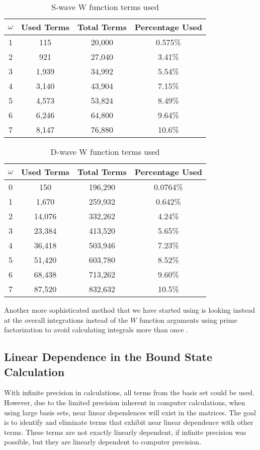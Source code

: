 \documentclass[Dissertation.tex]{subfiles}
\begin{document}
\begin{table}
\centering
\begin{tabular}{c c c c}
\toprule
$\omega$ & Used Terms & Total Terms & Percentage Used \\
\midrule
1 & 	115   &  20,000 & 	0.575\% \\
2 & 	921   &  27,040 & 	3.41\% \\
3 & 	1,939 &  34,992 & 	5.54\% \\
4 & 	3,140 &  43,904 & 	7.15\% \\
5 & 	4,573 &  53,824 &	8.49\% \\
6 & 	6,246 &  64,800 &	9.64\% \\
7 & 	8,147 &  76,880 &	10.6\% \\
\bottomrule
\end{tabular}
\caption{S-wave W function terms used}
\label{tab:WFuncUnusedS}
\end{table}

\begin{table}
\centering
\begin{tabular}{c c c c}
\toprule
$\omega$ & Used Terms & Total Terms & Percentage Used \\
\midrule
0 & 150		&	196,290 &	0.0764\% \\
1 & 1,670	&	259,932 &	0.642\% \\
2 & 14,076	&	332,262 &	4.24\% \\
3 & 23,384	&	413,520 &	5.65\% \\
4 & 36,418	&	503,946 &	7.23\% \\
5 & 51,420  &	603,780 &	8.52\% \\
6 & 68,438	&	713,262 &	9.60\% \\
7 & 87,520	&	832,632 &  10.5\% \\
\bottomrule
\end{tabular}
\caption{D-wave W function terms used}
\label{tab:WFuncUnusedD}
\end{table}
Another more sophisticated method that we have started using is
looking instead at the overall integrations instead of the $W$ function
arguments using prime factorization to avoid calculating integrals
more than once \cite{VanReethPrivate}.



\subsection{Linear Dependence in the Bound State Calculation}
With infinite precision in calculations, all terms from the basis set could 
be used. However, due to the limited precision inherent in computer 
calculations, when using large basis sets, near linear dependences will exist 
in the matrices. The goal is to identify and eliminate terms that exhibit 
near linear dependence with other terms. These terms are not exactly linearly 
dependent, if infinite precision was possible, but they are linearly 
dependent to computer precision.
\end{document}

